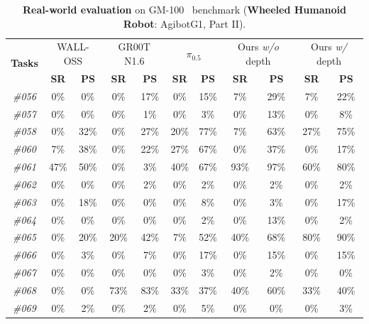 \begin{table}[t]
  \centering
  \caption{\textbf{Real-world evaluation} on GM-100~\cite{gm100} benchmark (\textbf{Wheeled Humanoid Robot}: AgibotG1, Part II).}
  \small
  \setlength{\tabcolsep}{12pt}
    \begin{tabular}{ccccccccccc}
    \toprule
    \multirow{2}[2]{*}{\textbf{Tasks}} & \multicolumn{2}{c}{WALL-OSS} & \multicolumn{2}{c}{GR00T N1.6} & \multicolumn{2}{c}{$\pi_{0.5}$} & \multicolumn{2}{c}{Ours \textit{w/o} depth} & \multicolumn{2}{c}{Ours \textit{w/} depth} \\
          & \textbf{SR} & \textbf{PS} & \textbf{SR} & \textbf{PS} & \textbf{SR} & \textbf{PS} & \textbf{SR} & \textbf{PS} & \textbf{SR} & \textbf{PS} \\
    \midrule
    \textit{\#056} & 0\%   & 0\%   & 0\%   & 17\%  & 0\%   & 15\%  & 7\%   & 29\%  & 7\%   & 22\% \\
    \textit{\#057} & 0\%   & 0\%   & 0\%   & 1\%   & 0\%   & 3\%   & 0\%   & 13\%  & 0\%   & 8\% \\
    \textit{\#058} & 0\%   & 32\%  & 0\%   & 27\%  & 20\%  & 77\%  & 7\%   & 63\%  & 27\%  & 75\% \\
    \textit{\#060} & 7\%   & 38\%  & 0\%   & 22\%  & 27\%  & 67\%  & 0\%   & 37\%  & 0\%   & 17\% \\
    \textit{\#061} & 47\%  & 50\%  & 0\%   & 3\%   & 40\%  & 67\%  & 93\%  & 97\%  & 60\%  & 80\% \\
    \textit{\#062} & 0\%   & 0\%   & 0\%   & 2\%   & 0\%   & 2\%   & 0\%   & 2\%   & 0\%   & 2\% \\
    \textit{\#063} & 0\%   & 18\%  & 0\%   & 0\%   & 0\%   & 8\%   & 0\%   & 3\%   & 0\%   & 17\% \\
    \textit{\#064} & 0\%   & 0\%   & 0\%   & 0\%   & 0\%   & 2\%   & 0\%   & 13\%  & 0\%   & 2\% \\
    \textit{\#065} & 0\%   & 20\%  & 20\%  & 42\%  & 7\%   & 52\%  & 40\%  & 68\%  & 80\%  & 90\% \\
    \textit{\#066} & 0\%   & 3\%   & 0\%   & 7\%   & 0\%   & 17\%  & 0\%   & 15\%  & 0\%   & 15\% \\
    \textit{\#067} & 0\%   & 0\%   & 0\%   & 0\%   & 0\%   & 3\%   & 0\%   & 2\%   & 0\%   & 0\% \\
    \textit{\#068} & 0\%   & 0\%   & 73\%  & 83\%  & 33\%  & 37\%  & 40\%  & 60\%  & 33\%  & 40\% \\
    \textit{\#069} & 0\%   & 2\%   & 0\%   & 2\%   & 0\%   & 5\%   & 0\%   & 0\%   & 0\%   & 3\% \\

\end{tabular}
\end{table}
